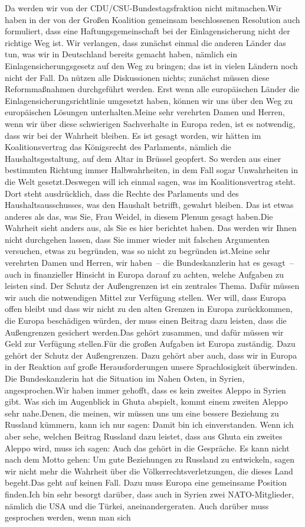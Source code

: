 \documentclass{article}
\begin{document}
Da werden wir von der CDU/CSU-Bundestagsfraktion nicht mitmachen.Wir haben in der von der Großen Koalition gemeinsam beschlossenen Resolution auch formuliert, dass eine Haftungsgemeinschaft bei der Einlagensicherung nicht der richtige Weg ist. Wir verlangen, dass zunächst einmal die anderen Länder das tun, was wir in Deutschland bereits gemacht haben, nämlich ein Einlagensicherungsgesetz auf den Weg zu bringen; das ist in vielen Ländern noch nicht der Fall. Da nützen alle Diskussionen nichts; zunächst müssen diese Reformmaßnahmen durchgeführt werden. Erst wenn alle europäischen Länder die Einlagensicherungsrichtlinie umgesetzt haben, können wir uns über den Weg zu europäischen Lösungen unterhalten.Meine sehr verehrten Damen und Herren, wenn wir über diese schwierigen Sachverhalte in Europa reden, ist es notwendig, dass wir bei der Wahrheit bleiben. Es ist gesagt worden, wir hätten im Koalitionsvertrag das Königsrecht des Parlaments, nämlich die Haushaltsgestaltung, auf dem Altar in Brüssel geopfert. So werden aus einer bestimmten Richtung immer Halbwahrheiten, in dem Fall sogar Unwahrheiten in die Welt gesetzt.Deswegen will ich einmal sagen, was im Koalitionsvertrag steht. Dort steht ausdrücklich, dass die Rechte des Parlaments und des Haushaltsausschusses, was den Haushalt betrifft, gewahrt bleiben. Das ist etwas anderes als das, was Sie, Frau Weidel, in diesem Plenum gesagt haben.Die Wahrheit sieht anders aus, als Sie es hier berichtet haben. Das werden wir Ihnen nicht durchgehen lassen, dass Sie immer wieder mit falschen Argumenten versuchen, etwas zu begründen, was so nicht zu begründen ist.Meine sehr verehrten Damen und Herren, wir haben – die Bundeskanzlerin hat es gesagt – auch in finanzieller Hinsicht in Europa darauf zu achten, welche Aufgaben zu leisten sind. Der Schutz der Außengrenzen ist ein zentrales Thema. Dafür müssen wir auch die notwendigen Mittel zur Verfügung stellen. Wer will, dass Europa offen bleibt und dass wir nicht zu den alten Grenzen in Europa zurückkommen, die Europa beschädigen würden, der muss einen Beitrag dazu leisten, dass die Außengrenzen gesichert werden.Das gehört zusammen, und dafür müssen wir Geld zur Verfügung stellen.Für die großen Aufgaben ist Europa zuständig. Dazu gehört der Schutz der Außengrenzen. Dazu gehört aber auch, dass wir in Europa in der Reaktion auf große Herausforderungen unsere Sprachlosigkeit überwinden. Die Bundeskanzlerin hat die Situation im Nahen Osten, in Syrien, angesprochen.Wir haben immer gehofft, dass es kein zweites Aleppo in Syrien gibt. Was sich im Augenblick in Ghuta abspielt, kommt einem zweiten Aleppo sehr nahe.Denen, die meinen, wir müssen uns um eine bessere Beziehung zu Russland kümmern, kann ich nur sagen: Damit bin ich einverstanden. Wenn ich aber sehe, welchen Beitrag Russland dazu leistet, dass aus Ghuta ein zweites Aleppo wird, muss ich sagen: Auch das gehört in die Gespräche. Es kann nicht nach dem Motto gehen: Um gute Beziehungen zu Russland zu entwickeln, sagen wir nicht mehr die Wahrheit über die Völkerrechtsverletzungen, die dieses Land begeht.Das geht auf keinen Fall. Dazu muss Europa eine gemeinsame Position finden.Ich bin sehr besorgt darüber, dass auch in Syrien zwei NATO-Mitglieder, nämlich die USA und die Türkei, aneinandergeraten. Auch darüber muss gesprochen werden, wenn man sich 
\end{document}
